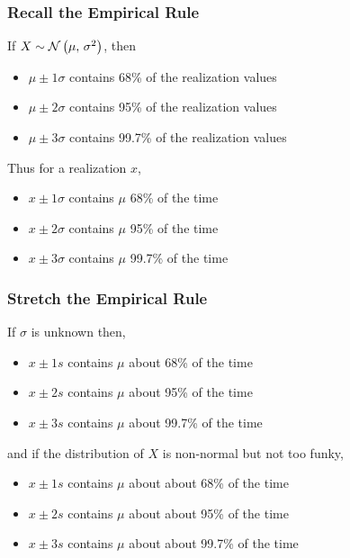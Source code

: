 \documentclass[slides]{beamer} %
\begin{document}
\begin{frame}\frametitle{Recall the Empirical Rule}

If $X \sim \mathcal{N}\left(\mu,\,\sigma^2\right)$, then 

\begin{itemize}
\item $\mu \pm 1 \sigma$ contains 68\% of the realization values
\item $\mu \pm 2 \sigma$ contains 95\% of the realization values
\item $\mu \pm 3 \sigma$ contains 99.7\% of the realization values
\end{itemize} \pause 

Thus for a realization $x$,

\begin{itemize}
\item $x \pm 1 \sigma$ contains $\mu$ 68\% of the time
\item $x \pm 2 \sigma$ contains $\mu$ 95\% of the time
\item $x \pm 3 \sigma$ contains $\mu$ 99.7\% of the time
\end{itemize}

\end{frame}

\begin{frame}\frametitle{Stretch the Empirical Rule}

If $\sigma$ is unknown then,

\begin{itemize}
\item $x \pm 1 s$ contains $\mu$ about 68\% of the time
\item $x \pm 2 s$ contains $\mu$ about 95\% of the time
\item $x \pm 3 s$ contains $\mu$ about 99.7\% of the time
\end{itemize} \pause 

and if the distribution of $X$ is non-normal but not too funky,

\begin{itemize}
\item $x \pm 1 s$ contains $\mu$ about about 68\% of the time
\item $x \pm 2 s$ contains $\mu$ about about 95\% of the time
\item $x \pm 3 s$ contains $\mu$ about about 99.7\% of the time
\end{itemize}

\end{frame}
\end{document}
